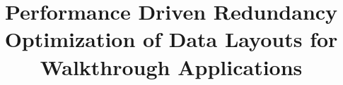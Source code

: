 \documentclass[conference]{acmsiggraph}
\title{Performance Driven Redundancy Optimization of Data Layouts for Walkthrough Applications}
\author{}
\begin{document}

\maketitle





\keywordlist


\TOGlinkslist


\copyrightspace












%
\end{document}
